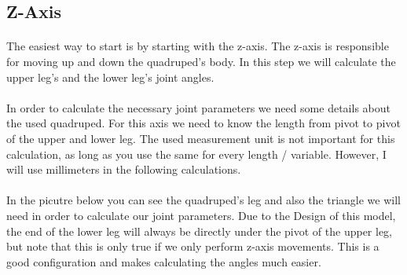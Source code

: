 \documentclass{article}
\begin{document}
    
    \pagebreak
    \subsection{Z-Axis}
    \paragraph{} %
    The easiest way to start is by starting with the z-axis. The z-axis is responsible for moving up and down the quadruped's body. In this step we will calculate the upper leg's and the lower leg's joint angles.

    \paragraph{}
    In order to calculate the necessary joint parameters we need some details about the used quadruped. For this axis we need to know the length from pivot to pivot of the upper and lower leg. The used measurement unit is not important for this calculation, as long as you use the same for every length / variable. However, I will use millimeters in the following calculations.

    \paragraph{}
    In the picutre below you can see the quadruped's leg and also the triangle we will need in order to calculate our joint parameters. Due to the Design of this model, the end of the lower leg will always be directly under the pivot of the upper leg, but note that this is only true if we only perform z-axis movements. This is a good configuration and makes calculating the angles much easier.
    
\end{document}
